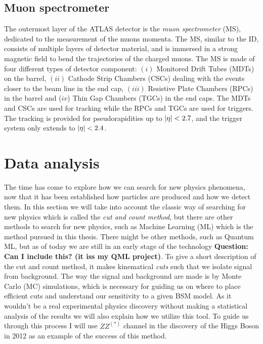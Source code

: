 \documentclass[12pt, a4paper]{book}
\begin{document}
\subsection{Muon spectrometer}\label{sec:MS}
The outermost layer of the ATLAS detector is the \textit{muon spectrometer} (MS), dedicated to the measurement of the muons momenta. The MS, similar to the ID, consists of multiple layers of detector material, 
and is immersed in a strong magnetic field to bend the trajectories of the charged muons. The MS is made of four different types of detector component: $(i)$ Monitored Drift Tubes (MDTs) on the barrel, 
$(ii)$ Cathode Strip Chambers (CSCs) dealing with the events closer to the beam line in the end cap, $(iii)$ Resistive Plate Chambers (RPCs) in the barrel and ($iv$) Thin Gap Chambers (TGCs) in the end caps. 
The MDTs and CSCs are used for tracking while the RPCs and TGCs are used for triggers. The tracking is provided for pseudorapidities up to $\abs{\eta}<2.7$, and the trigger system only extends to $\abs{\eta}<2.4$.






\clearpage
\section{Data analysis}\label{sec:data_anal}
The time has come to explore how we can search for new physics phenomena, now that it has been established how particles are produced and how we detect them. In this section we will take into account the classic way of searching for new physics which is called 
the \textit{cut and count method}, but there are other methods to search for new physics, such as Machine Learning (ML) which is the method pursued in this thesis. There might be other methods, such as 
Quantum ML, but as of today we are still in an early stage of the technology \cite{QML}\textbf{Question: Can I include this? (it iss my QML project)}. To give a short description of the cut and count method, it makes kinematical \textit{cuts} such that we isolate signal from background. The way 
the signal and background are made is by Monte Carlo (MC) simulations, which is necessary for guiding us on where to place efficient cuts and understand our sensitivity to a given BSM model. As it wouldn't be a real experimental physics discovery without making a statistical 
analysis of the results we will also explain how we utilize this tool. To guide us through this process I will use $ZZ^{(*)}$ channel in the discovery of the Higgs Boson in 2012 \cite{Higgs_discovery_2012} as an example of the success of this method.
\end{document}
